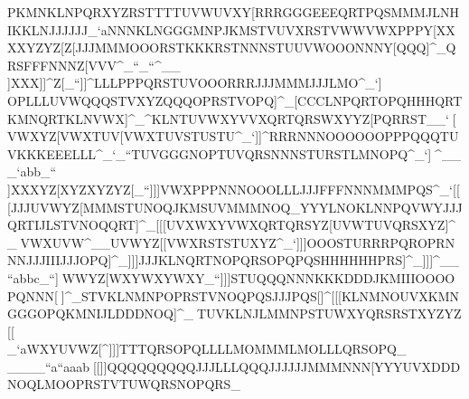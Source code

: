 PKMNKLNPQRXYZRSTTTTUVWUVXY[\                                                            RRRGGGEEEQRTPQSMMMJLNHIKKLNJJJJJJ_`a                                                            NNNKLNGGGMNPJKMSTVUVXRSTVWWVWXPPPY[\                                                            XXXXYZYZ[Z[\YYZUVWQRSQRSPPPWXYVWXZ[]                                                            JJJMMMOOORSTKKKRSTNNNSTUUVWOOONNNY[\                                                            QQQ]^_QRSFFFNNNZ[\UVWQQQTUVTUVQRSZ[]                                                            VVV\]^_``_``^__\\]XXX]]^Z[\UVWWXY_``                                                            ]]^LLLPPPQRSTUVOOORRRJJJMMMJJJLMO^_`                                                            ]^^MOPLLLUVWQQQSTVXYZQQQOPRSTVOPQ]^_                                                            [\]CCCLNPQRTOPQHHHQRTKMNQRTKLNVWX]^_                                                            \]^KLNTUVWXYVVXQRTQRSWXYYZ[PQRRST__`                                                            ^^_[\]VWXYZ[VWXTUV[\]VWXTUVSTUSTU^_`                                                            ]]^RRRNNNOOOOOOPPPQQQTUVKKKEEELLL^_`                                                            _``TUVGGGNOPTUVQRSNNNSTURSTLMNOPQ^_`                                                            ]^^]^___`abb_``\\]XXXYZ[XYZXYZYZ[_``                                                            ]]]VWXPPPNNNOOOLLLJJJFFFNNNMMMPQS^_`                                                            [[[JJJUVWYZ[MMMSTUNOQJKMSUVMMMNOQ\]_                                                            YYYLNOKLNNPQVWYJJJQRTIJLSTVNOQQRT]^_                                                            [[[UVXWXYVWXQRTQRSYZ[UVWTUVQRSXYZ]^_                                                            ^^^VWXUVW^__UVWYZ[[\]VWXRSTSTUXYZ^_`                                                            ]]]OOOSTURRRPQROPRNNNJJJIIIJJJOPQ]^_                                                            ]]]JJJKLNQRTNOPQRSOPQPQSHHHHHHPRS]^_                                                            ]]]^__``abbc_``]^^WWWYZ[WXYWXYWXY_``                                                            ]]]STUQQQNNNKKKDDDJKMIIIOOOOPQNNN[\]                                                            ^^^]^_STVKLNMNPOPRSTVNOQPQSJJJPQS[]^                                                            [[[KLNMNOUVXKMNGGGOPQKMNIJLDDDNOQ]^_                                                            ^^^TUVKLNJLMMNPSTUWXYQRSRSTXYZYZ[[\]                                                            \\\VWXXYZ_`aWXYUVWZ[\VWXQRSRSTXYZ\]^                                                            ]]]TTTQRSOPQLLLLMOMMMLMOLLLQRSOPQ\]_                                                            \\\MMMTUVLMOTUVRSTGGGHHHMNPPQSQRT\]_                                                            ___``a``aaab^^_[[\VVVZZ[XYZXYZXYZ_``                                                            ]]]QQQQQQQQQJJJLLLQQQJJJJJJMMMNNN[\]                                                            YYYUVXDDDNOQLMOOPRSTVTUWQRSNOPQRS\]_                            